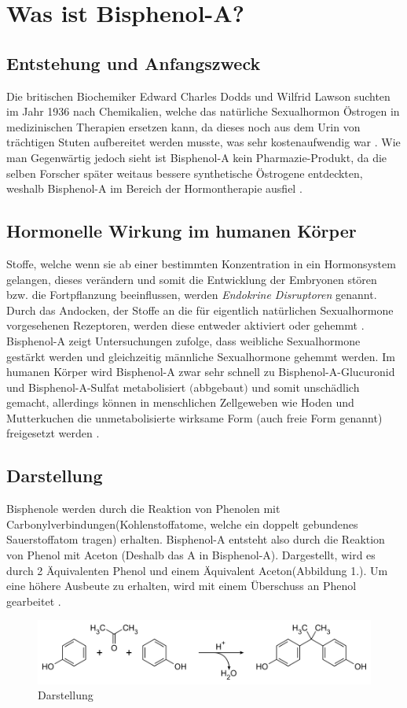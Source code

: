 \section{Was ist Bisphenol-A?}
\subsection{Entstehung und Anfangszweck}
Die britischen Biochemiker Edward Charles Dodds und Wilfrid Lawson suchten
im Jahr 1936 nach Chemikalien, welche das natürliche Sexualhormon Östrogen in medizinischen
Therapien ersetzen kann, da dieses noch aus dem Urin von trächtigen Stuten
aufbereitet werden musste, was sehr kostenaufwendig war \cite[]{Umweltbundesamt2010}.
Wie man Gegenwärtig jedoch sieht ist Bisphenol-A kein Pharmazie-Produkt, da die selben Forscher
später weitaus bessere synthetische Östrogene entdeckten, weshalb Bisphenol-A im Bereich
der Hormontherapie ausfiel \cite{Wikipedia}.
\subsection{Hormonelle Wirkung im humanen Körper}
Stoffe, welche wenn sie ab einer bestimmten Konzentration in ein Hormonsystem gelangen,
dieses verändern und somit die Entwicklung der Embryonen stören bzw. die Fortpflanzung
beeinflussen, werden \textit{Endokrine Disruptoren} genannt.
Durch das Andocken, der Stoffe an die für eigentlich natürlichen Sexualhormone
vorgesehenen Rezeptoren, werden diese entweder aktiviert oder gehemmt \cite{Umweltbundesamt2010}.
Bisphenol-A zeigt Untersuchungen zufolge, dass weibliche Sexualhormone gestärkt werden und
gleichzeitig männliche Sexualhormone gehemmt werden.
Im humanen Körper wird Bisphenol-A zwar sehr schnell zu Bisphenol-A-Glucuronid und
Bisphenol-A-Sulfat metabolisiert $($abbgebaut$)$ und somit unschädlich gemacht, allerdings
können in menschlichen Zellgeweben wie Hoden und Mutterkuchen die unmetabolisierte wirksame
Form (auch freie Form genannt) freigesetzt werden \cite{Umweltbundesamt2010}.

\subsection{Darstellung}
Bisphenole werden durch die Reaktion von Phenolen mit Carbonylverbindungen(Kohlenstoffatome, welche ein doppelt gebundenes Sauerstoffatom tragen) erhalten. Bisphenol-A entsteht also durch die Reaktion von Phenol mit Aceton (Deshalb das \glqq A\grqq{} in Bisphenol-A). Dargestellt, wird es durch 2 Äquivalenten Phenol und einem Äquivalent Aceton(Abbildung 1.). Um eine höhere Ausbeute zu erhalten, wird mit einem Überschuss an Phenol gearbeitet \cite{Herstellung}.\\
\begin{figure}[htpb]
    \centering
    \includegraphics[width=.75\textwidth]{Darstellung.png}
    \caption{Darstellung \cite{Wikipedia}}
\end{figure}
\newpage
